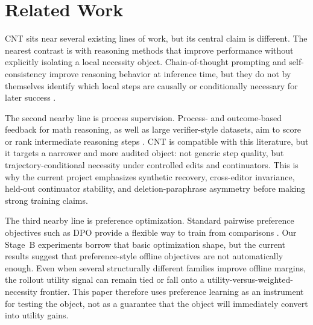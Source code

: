 \section{Related Work}

CNT sits near several existing lines of work, but its central claim is different. The nearest contrast is with reasoning methods that improve performance without explicitly isolating a local necessity object. Chain-of-thought prompting and self-consistency improve reasoning behavior at inference time, but they do not by themselves identify which local steps are causally or conditionally necessary for later success \citep{wei2023chainofthoughtpromptingelicitsreasoning,wang2023selfconsistencyimproveschainthought}.

The second nearby line is process supervision. Process- and outcome-based feedback for math reasoning, as well as large verifier-style datasets, aim to score or rank intermediate reasoning steps \citep{uesato2022solvingmathwordproblems,lightman2023letsverifystepstep}. CNT is compatible with this literature, but it targets a narrower and more audited object: not generic step quality, but trajectory-conditional necessity under controlled edits and continuators. This is why the current project emphasizes synthetic recovery, cross-editor invariance, held-out continuator stability, and deletion-paraphrase asymmetry before making strong training claims.

The third nearby line is preference optimization. Standard pairwise preference objectives such as DPO provide a flexible way to train from comparisons \citep{rafailov2024directpreferenceoptimizationlanguage}. Our Stage~B experiments borrow that basic optimization shape, but the current results suggest that preference-style offline objectives are not automatically enough. Even when several structurally different families improve offline margins, the rollout utility signal can remain tied or fall onto a utility-versus-weighted-necessity frontier. This paper therefore uses preference learning as an instrument for testing the object, not as a guarantee that the object will immediately convert into utility gains.
